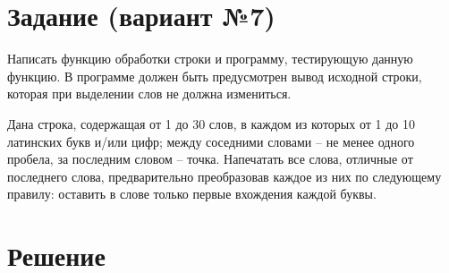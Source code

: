 \documentclass[12pt]{article}
\begin{document}
\section*{Задание (вариант №7)}
Написать функцию обработки строки и программу, тестирующую данную функцию. В программе должен быть предусмотрен вывод исходной строки, которая при выделении слов не должна измениться.

Дана строка, содержащая от 1 до 30 слов, в каждом из которых от 1 до 10 латинских букв и/или цифр; между соседними словами – не менее одного пробела, за последним словом – точка. Напечатать все слова, отличные от последнего слова, предварительно преобразовав каждое из них по следующему правилу: оставить в слове только первые вхождения каждой буквы.

\newpage


\section*{Решение}

\end{document}
